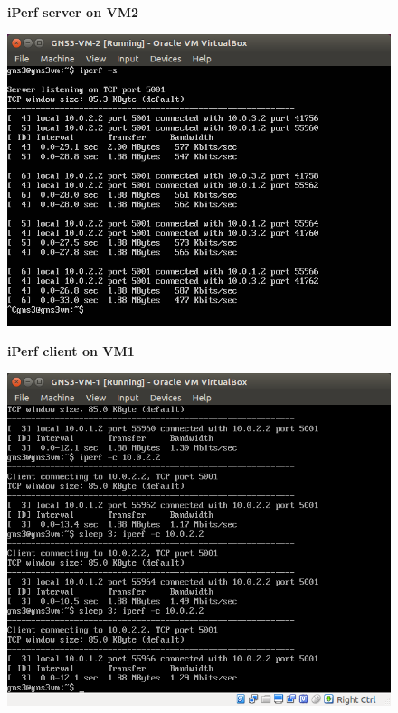 \documentclass[a4paper]{scrreprt}
\begin{document}
\begin{figure}
    \centering
    \textbf{iPerf server on VM2}\par\medskip
    \includegraphics[width=\textwidth]{resources/iperf_server_vm2.png}
\end{figure}

\begin{figure}
    \centering
    \textbf{iPerf client on VM1}\par\medskip
    \includegraphics[width=\textwidth]{resources/iperf_vm1.png}
\end{figure}
\end{document}

